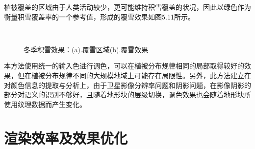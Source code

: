 植被覆盖的区域由于人类活动较少，更可能维持积雪覆盖的状况，因此以绿色作为衡量积雪覆盖率的一个参考值，形成的覆雪效果如图5.11所示。
\begin{figure}[H]
    \centering
     \\
    \caption{冬季积雪效果：(a).覆雪区域(b).覆雪效果}
\end{figure}
本方法使用统一的输入色进行调色，可以在植被分布规律相同的局部取得较好的效果，但在植被分布规律不同的大规模地域上可能存在局限性。另外，此方法建立在对颜色信息的提取与分析上，由于卫星影像分辨率问题和阴影问题，在影像阴影的部分对语义的识别不够好，且随着地形块的层级切换，调色效果也会随着地形块所使用纹理数据而产生变化。\par
\section{渲染效率及效果优化}
